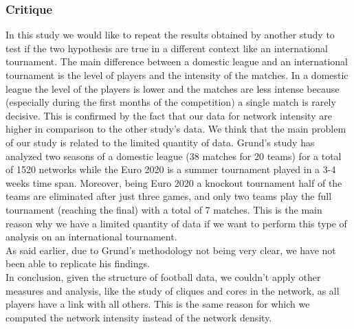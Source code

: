 \documentclass[12pt, a4paper]{article}
\begin{document}
\subsubsection{Critique}
\label{critique}
In this study we would like to repeat the results obtained by another study \cite{GRUND} to test if the two hypothesis are true in a different context like an international tournament. The main difference between a domestic league and an international tournament is the level of players and the intensity of the matches. In a domestic league the level of the players is lower and the matches are less intense because  (especially during the first months of the competition) a single match is rarely decisive. This is confirmed by the fact that our data for network intensity are higher in comparison to the other study's data. 
We think that the main problem of our study is related to the limited quantity of data. Grund's study has analyzed two seasons of a domestic league (38 matches for 20 teams) for a total of 1520 networks while the Euro 2020 is a summer tournament played in a 3-4 weeks time span. Moreover, being Euro 2020 a knockout tournament half of the teams are eliminated after just three games, and only two teams play the full tournament (reaching the final) with a total of 7 matches. This is the main reason why we have a limited quantity of data if we want to perform this type of analysis on an international tournament. \\
As said earlier, due to Grund's methodology not being very clear, we have not been able to replicate his findings.\\
In conclusion, given the structure of football data, we couldn't apply other measures and analysis, like the study of cliques and cores in the network, as all players have a link with all others. This is the same reason for which we computed the network intensity instead of the network density. \\





\nocite{*}
\end{document}
